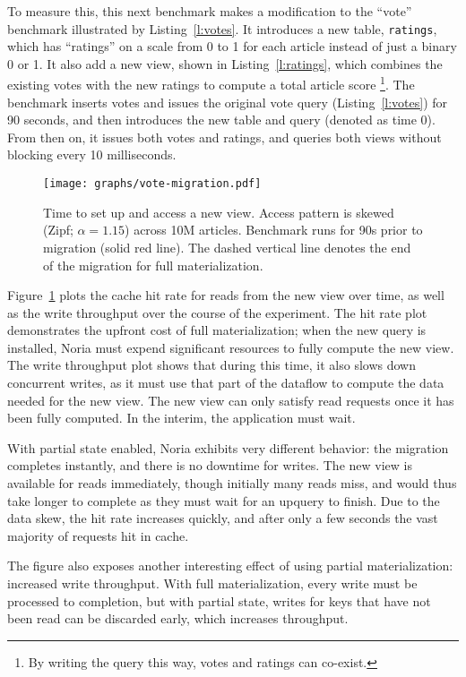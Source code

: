 To measure this, this next benchmark makes a modification to the ``vote''
benchmark illustrated by Listing~\ref{l:votes}. It introduces a new table,
\texttt{ratings}, which has ``ratings'' on a scale from 0 to 1 for each article
instead of just a binary 0 or 1. It also add a new view, shown in
Listing~\ref{l:ratings}, which combines the existing votes with the new ratings
to compute a total article score%
\footnote{By writing the query this way, votes and ratings can co-exist.}.
The benchmark inserts votes and issues the original vote query
(Listing~\ref{l:votes}) for 90 seconds, and then introduces the new table and
query (denoted as time 0). From then on, it issues both votes and ratings, and
queries both views without blocking every 10 milliseconds.

\begin{figure}[h]
  \centering
  \texttt{[image: graphs/vote-migration.pdf]}
  \caption{Time to set up and access a new view. Access pattern is skewed (Zipf;
  $\alpha = 1.15$) across 10M articles. Benchmark runs for 90s prior to
  migration (solid red line). The dashed vertical line denotes the end of the
  migration for full materialization.}
  \label{f:vote-migration}
\end{figure}

Figure~\ref{f:vote-migration} plots the cache hit rate for reads from the new
view over time, as well as the write throughput over the course of the
experiment. The hit rate plot demonstrates the upfront cost of full materialization;
when the new query is installed, Noria must expend significant
resources to fully compute the new view. The write throughput plot shows that
during this time, it also slows down concurrent writes, as it must use that part
of the dataflow to compute the data needed for the new view. The new view can
only satisfy read requests once it has been fully computed. In the interim, the
application must wait.

With partial state enabled, Noria exhibits very different behavior: the
migration completes instantly, and there is no downtime for writes. The new view
is available for reads immediately, though initially many reads miss, and would
thus take longer to complete as they must wait for an upquery to finish. Due to
the data skew, the hit rate increases quickly, and after only a few seconds the
vast majority of requests hit in cache.

The figure also exposes another interesting effect of using partial
materialization: increased write throughput. With full materialization, every
write must be processed to completion, but with partial state, writes for keys
that have not been read can be discarded early, which increases throughput.

